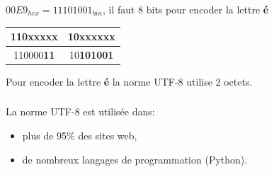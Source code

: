 \documentclass[svgnames,11pt]{beamer}
\begin{document}
\begin{frame}
    \frametitle{}
\begin{center}
    $00E9_{hex} = 11101001_{bin}$, il faut 8 bits pour encoder la lettre \textbf{é}
\end{center}
    \begin{center}
        \begin{tabular}{|*{2}{c|}}
            \hline
            110xxxxx&10xxxxxx\\
            \hline
110000\textbf{11}&10\textbf{101001}\\
\hline
        \end{tabular}
    \end{center}
Pour encoder la lettre \textbf{é} la norme UTF-8 utilise 2 octets.
\end{frame}
\begin{frame}
    \frametitle{}

    \begin{aretenir}[Remarques]
        La norme UTF-8 est utilisée dans:
    \begin{itemize}
        \item plus de 95\% des sites web,
        \item de nombreux langages de programmation (Python).
    \end{itemize}
    \end{aretenir}
\end{frame}
\end{document}
